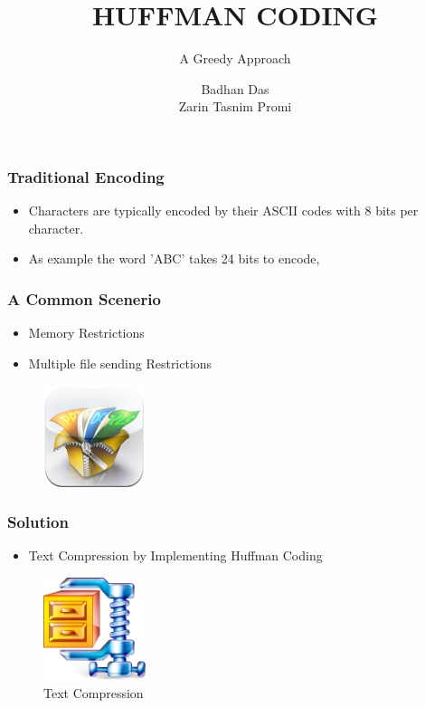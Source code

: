 \documentclass{beamer}
\title{\textbf{HUFFMAN CODING}}
\subtitle{A Greedy Approach}
\author{Badhan Das\\
	Zarin Tasnim Promi}
\institute{Bangladesh University of Engineering and Technology}
\begin{document}
\begin{frame}
\titlepage
\end{frame}

\begin{frame}
\frametitle{\textbf{Traditional Encoding}}
\begin{itemize}
 \item Characters are typically encoded by their ASCII codes with 8 bits per character.  
 \item As example the word 'ABC' takes 24 bits to encode,
\end{itemize}

\end{frame}




\begin{frame}
\frametitle{\textbf{A Common Scenerio}}
\begin{itemize}
 \item Memory Restrictions
 \item Multiple file sending Restrictions
\end{itemize}
\begin{figure}
  \includegraphics[width=3cm]{Z.png}
\end{figure}
\end{frame}

\begin{frame}
\frametitle{\textbf{Solution}}
\begin{itemize}
 \item Text Compression by Implementing Huffman Coding
\end{itemize}
\begin{figure}
  \includegraphics[width=3cm]{zip2.png}
  \caption{Text Compression}
  \label{fig:Text Compression}
\end{figure}
\end{frame}
\end{document}
